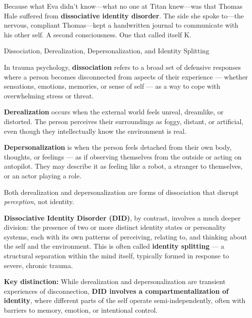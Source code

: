 Because what Eva didn’t know—what no one at Titan knew—was that Thomas Hale suffered from \textbf{dissociative identity disorder}.
The side she spoke to—the nervous, compliant Thomas—kept a handwritten journal to communicate with his other self.
A second consciousness.
One that called itself K.

\medskip

\begin{PsychologicalSidebar}{Dissociation, Derealization, Depersonalization, and Identity Splitting}

    In trauma psychology, \textbf{dissociation} refers to a broad set of defensive responses where a person becomes disconnected from aspects of their experience — whether sensations, emotions, memories, or sense of self — as a way to cope with overwhelming stress or threat.
    
    \medskip
    
    \textbf{Derealization} occurs when the external world feels unreal, dreamlike, or distorted. The person perceives their surroundings as foggy, distant, or artificial, even though they intellectually know the environment is real.
    
    \medskip
    
    \textbf{Depersonalization} is when the person feels detached from their own body, thoughts, or feelings — as if observing themselves from the outside or acting on autopilot. They may describe it as feeling like a robot, a stranger to themselves, or an actor playing a role.
    
    \medskip
    
    Both derealization and depersonalization are forms of dissociation that disrupt \textit{perception}, not identity.
    
    \medskip
    
    \textbf{Dissociative Identity Disorder (DID)}, by contrast, involves a much deeper division: the presence of two or more distinct identity states or personality systems, each with its own patterns of perceiving, relating to, and thinking about the self and the environment. This is often called \textbf{identity splitting} — a structural separation within the mind itself, typically formed in response to severe, chronic trauma.
    
    \medskip
    
    \textbf{Key distinction:}
    While derealization and depersonalization are transient experiences of disconnection, \textbf{DID involves a compartmentalization of identity}, where different parts of the self operate semi-independently, often with barriers to memory, emotion, or intentional control.
    

\end{PsychologicalSidebar}
